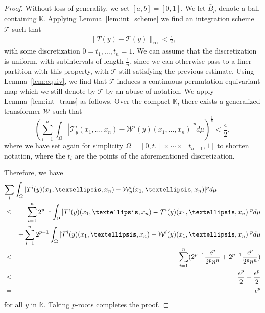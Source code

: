 \documentclass[a4paper,12pt,reqno]{amsart}
\theoremstyle{definition}
\theoremstyle{remark}
\begin{document}
\begin{proof}
        Without loss of generality, we set $[a,b] = [0,1]$. We let $\bar B_\rho$ denote a ball containing $\mathbb K$. Applying Lemma~\ref{lem:int_scheme} we find an integration scheme $\mathcal T$ such that 
        \begin{eqnarray*}
            \|T(y) - \mathcal T(y)\|_\infty < \frac{\epsilon}{2}, 
        \end{eqnarray*}
        with some discretization $0=t_1, \ldots , t_n = 1$. We can assume that the discretization is uniform, with subintervals of length $\frac{1}{n}$, since we can otherwise pass to a finer partition with this property, with $\mathcal T$ still satisfying the previous estimate.  
        Using Lemma~\ref{lem:equiv}, we find that $\mathcal T$ induces a continuous permutation equivariant map which we still denote by $\mathcal T$ by an abuse of notation. 
        We apply Lemma~\ref{lem:int_trans} as follows. Over the compact $\mathbb K$, there exists a generalized transformer $\mathcal W$ such that 
        \begin{equation*}
            \left (\sum_{i=1}^n \int_\Omega|\mathcal T^i_y(x_1,\ldots,x_n)- \mathcal W^i(y)(x_1,\ldots,x_n)|^pd\mu\right )^\frac{1}{p} < \frac{\epsilon}{2},
        \end{equation*}
         where we have set again for simplicity $\Omega = [0,t_1]\times \cdots \times [t_{n-1},1]$ to shorten notation, where the $t_i$ are the points of the aforementioned discretization. 

        Therefore, we have
        \begin{eqnarray*}
        \lefteqn{\sum_i \int_\Omega|T^i(y)(x_1,\ldots, x_n) - \mathcal W^i_y(x_1,\ldots, x_n)|^pd\mu}\\
        &\leq&  \sum_{i=1}^n 2^{p-1}\int_\Omega |T^i(y)(x_1,\ldots, x_n) - \mathcal T^i(y)(x_1,\ldots, x_n)|^pd\mu\\  
        && + \sum_{i=1}^n 2^{p-1}\int_\Omega|\mathcal T^i(y)(x_1,\ldots,x_n)-\mathcal W^i(y)(x_1,\ldots,x_n)|^pd\mu\\
        &<& \sum_{i=1}^n(2^{p-1}\frac{\epsilon^p}{2^pn^n} + 2^{p-1}\frac{\epsilon^p}{2^pn^n})\\
        &\leq& \frac{\epsilon^p}{2} + \frac{\epsilon^p}{2}\\
        &=& \epsilon^p
        \end{eqnarray*}
        for all $y$ in $\mathbb K$. Taking $p$-roots completes the proof.
\end{proof}
\end{document}
